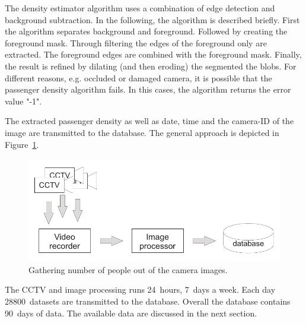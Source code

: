 The density estimator algorithm uses a combination of edge detection and background subtraction. In the  following, the algorithm is described briefly.
First the algorithm separates background and foreground. Followed by creating the foreground mask.
Through filtering the edges of the foreground only are extracted. The foreground edges are combined with the foreground mask. Finally, the result is refined by dilating (and then eroding) the segmented the blobs. %
For different reasons, e.g. occluded or damaged camera, it is possible that the passenger density algorithm fails. In this cases, the algorithm returns the error value "-1".

The extracted passenger density as well as date, time and the camera-ID of the image are transmitted to the database. The general approach is depicted in Figure~\ref{fig:CCTVimageProcessing}.

\begin{figure}[htbp]
  \centering
  \includegraphics[width=\linewidth]{Figures/imageProcessing.pdf} 
  \caption{Gathering number of people out of the camera images.}
  \label{fig:CCTVimageProcessing}
\end{figure}

The CCTV and image processing runs 24~hours, 7~days a week. Each day 28800~datasets are transmitted to the database. Overall the database contains 90~days of data. The available data are discussed in the next section.

